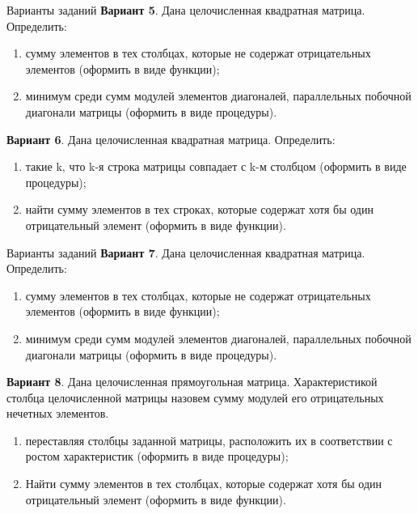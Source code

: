 \documentclass{beamer}
\begin{document}
\begin{frame}{Варианты заданий}
\textbf{Вариант 5}. Дана целочисленная квадратная матрица. Определить:
\begin{enumerate}
\item сумму элементов в тех столбцах, которые не содержат отрицательных элементов (оформить в виде функции);
\item минимум среди сумм модулей элементов диагоналей, параллельных побочной диагонали матрицы (оформить в виде процедуры).
\end{enumerate}
\textbf{Вариант 6}. Дана целочисленная квадратная матрица. Определить:
\begin{enumerate}
\item такие k, что k-я строка матрицы совпадает с k-м столбцом (оформить в виде процедуры); 
\item найти сумму элементов в тех строках, которые содержат хотя бы один отрицательный элемент (оформить в виде функции).
\end{enumerate}
\end{frame}

\begin{frame}{Варианты заданий}
\textbf{Вариант 7}. Дана целочисленная квадратная матрица. Определить:
\begin{enumerate}
\item сумму элементов в тех столбцах, которые не содержат отрицательных элементов (оформить в виде функции);
\item минимум среди сумм модулей элементов диагоналей, параллельных побочной диагонали матрицы (оформить в виде процедуры).
\end{enumerate}
\textbf{Вариант 8}. Дана целочисленная прямоугольная матрица. Характеристикой столбца целочисленной матрицы назовем сумму модулей его отрицательных нечетных элементов. 
\begin{enumerate}
\item переставляя столбцы заданной матрицы, расположить их в соответствии с ростом характеристик (оформить в виде
процедуры); 
\item Найти сумму элементов в тех столбцах, которые содержат хотя бы один отрицательный элемент (оформить в виде функции).
\end{enumerate}
\end{frame}
\end{document}
